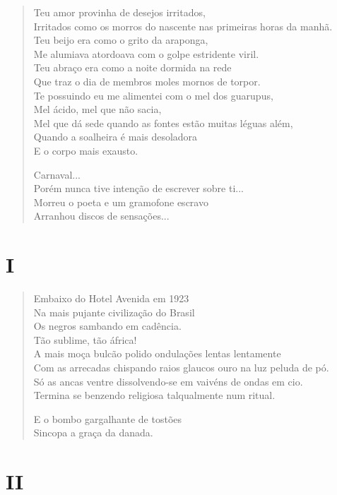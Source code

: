 \begin{verse}
Teu amor provinha de desejos irritados,\\
Irritados como os morros do nascente nas primeiras horas da manhã.\\
Teu beijo era como o grito da araponga,\\
Me alumiava atordoava com o golpe estridente viril.\\
Teu abraço era como a noite dormida na rede\\
Que traz o dia de membros moles mornos de torpor.\\
Te possuindo eu me alimentei com o mel dos guarupus,\\
Mel ácido, mel que não sacia,\\
Mel que dá sede quando as fontes estão muitas léguas além,\\
Quando a soalheira é mais desoladora\\
E o corpo mais exausto.

Carnaval...\\
Porém nunca tive intenção de escrever sobre ti...\\
Morreu o poeta e um gramofone escravo\\
Arranhou discos de sensações...
\end{verse}

\section{I}

\begin{verse}
Embaixo do Hotel Avenida em 1923\\
Na mais pujante civilização do Brasil\\
Os negros sambando em cadência.\\
Tão sublime, tão áfrica!\\
A mais moça bulcão polido ondulações lentas lentamente\\
Com as arrecadas chispando raios glaucos ouro na luz peluda de pó.\\
Só as ancas ventre dissolvendo-se em vaivéns de ondas em cio.\\
Termina se benzendo religiosa talqualmente num ritual.

E o bombo gargalhante de tostões\\
Sincopa a graça da danada.
\end{verse}

\section{II}

